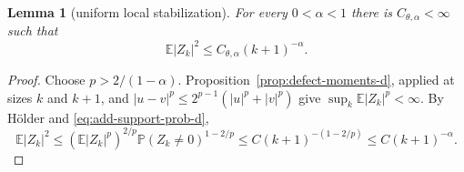 \documentclass[11pt]{article}
\numberwithin{equation}{section}
\newtheorem{lemma}[theorem]{Lemma}
\newcommand{\1}{\mathbf 1}\newcommand{\F}{\mathcal F}\newcommand{\D}{\mathcal D}
\begin{document}
\begin{lemma}[uniform local stabilization]\label{lem:uniform-localstab-d}
For every $0<\alpha<1$ there is $C_{\theta,\alpha}<\infty$ such that
\begin{equation}
 \mathbb E|Z_k|^2\le C_{\theta,\alpha}(k+1)^{-\alpha}.         \label{eq:uniform-localstab-d}
\end{equation}
\end{lemma}
\begin{proof}
Choose $p>2/(1-\alpha)$.  Proposition~\ref{prop:defect-moments-d}, applied
at sizes $k$ and $k+1$, and $|u-v|^p\le2^{p-1}(|u|^p+|v|^p)$ give
$\sup_k\mathbb E|Z_k|^p<\infty$.  By H\"older and
\eqref{eq:add-support-prob-d},
\[
 \mathbb E|Z_k|^2
 \le(\mathbb E|Z_k|^p)^{2/p}\mathbb P(Z_k\ne0)^{1-2/p}
 \le C(k+1)^{-(1-2/p)}\le C(k+1)^{-\alpha}.
\]
\end{proof}
\end{document}
